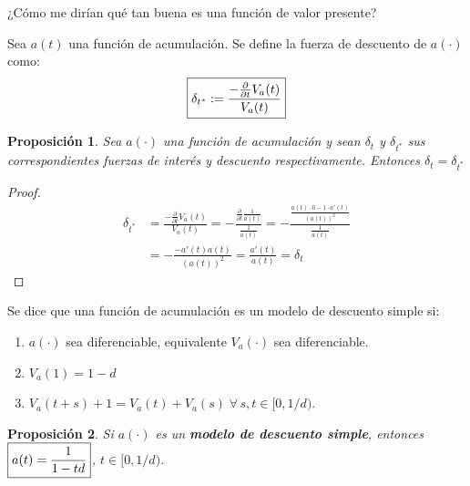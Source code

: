 \documentclass[
]{book}
\newtheorem{proposition}{Proposición}[chapter]
\theoremstyle{definition}
\theoremstyle{definition}
\theoremstyle{definition}
\theoremstyle{definition}
\theoremstyle{remark}
\begin{document}
¿Cómo me dirían qué tan buena es una función de valor presente?

Sea \(a(t)\) una función de acumulación. Se define la {fuerza de descuento de \(a(\cdot)\)} como:
\[\boxed{\color{black} \delta_{t^{*}}:= \frac{-\frac{\partial}{\partial t}V_a(t)}{V_a(t)}}\]

\begin{proposition}
Sea \(a(\cdot)\) una función de acumulación y sean \(\delta_t\) y \(\delta_{t^*}\) sus correspondientes fuerzas de interés y descuento respectivamente.
Entonces \(\delta_t = \delta_{t^{*}}\)
\end{proposition}

\begin{proof}
\begin{align*}
\delta_{t^{*}} &= \frac{-\frac{\partial}{\partial t} V_a(t)}{V_a(t)} = - \frac{\frac{\partial}{\partial t}\frac{1}{a(t)}}{\frac{1}{a(t)}} = - \frac{\frac{a(t) \cdot 0 - 1\cdot a'(t)}{\left(a(t) \right)^2 }}{\frac{1}{a(t)}} \\
& = -\frac{-a'(t)a(t)}{\left(a(t) \right)^{2}} = \frac{a'(t)}{a(t)} = \delta_t  
\end{align*}
\end{proof}

Se dice que una función de acumulación es un {modelo de descuento simple} si:

\begin{enumerate}
\def\labelenumi{(\arabic{enumi})}
\item
  \(a(\cdot)\) sea diferenciable, equivalente \(V_a(\cdot)\) sea diferenciable.
\item
  \(V_a(1) = 1-d\)
\item
  \(V_a(t+s)+1 = V_a(t) + V_a(s) \; \forall \, s,t \in [0, 1/d)\).
\end{enumerate}

\begin{proposition}
Si \(a(\cdot)\) es un \textbf{modelo de descuento simple}, entonces \(\boxed{\color{black}a(t) = \frac{1}{1-td}}\), \(t\in[0,1/d)\).
\end{proposition}
\end{document}
